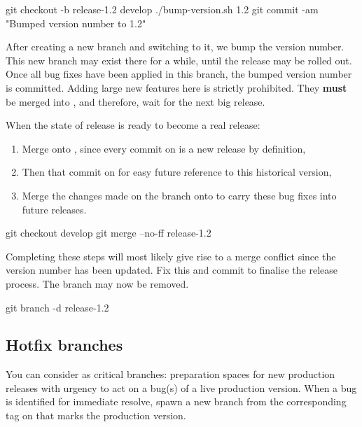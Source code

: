 \begin{git-bash}
    git checkout -b release-1.2 develop
    ./bump-version.sh 1.2
    git commit -am "Bumped version number to 1.2"
\end{git-bash}

After creating a new branch and switching to it, we bump the version number. This new branch may exist there for a while, until the release may be rolled out. Once all bug fixes have been applied in this branch, the bumped version number is committed. Adding large new features here is strictly prohibited. They \textbf{must} be merged into , and therefore, wait for the next big release. \newline

When the state of release is ready to become a real release:

\begin{enumerate}
	\item Merge onto , since every commit on  is a new release by definition,
	\item Then  that commit on  for easy future reference to this historical version,
	\item Merge the changes made on the  branch onto  to carry these bug fixes into future releases.
\end{enumerate}

\begin{git-bash}
    git checkout develop
    git merge --no-ff release-1.2
\end{git-bash}

Completing these steps will most likely give rise to a merge conflict since the version number has been updated. Fix this and commit to finalise the release process. The  branch may now be removed.

\begin{git-bash}
    git branch -d release-1.2
\end{git-bash}



\subsection{Hotfix branches}

You can consider  as critical  branches: preparation spaces for new production releases with urgency to act on a bug(s) of a live production version. When a bug is identified for immediate resolve, spawn a new  branch from the corresponding tag on  that marks the production version.

